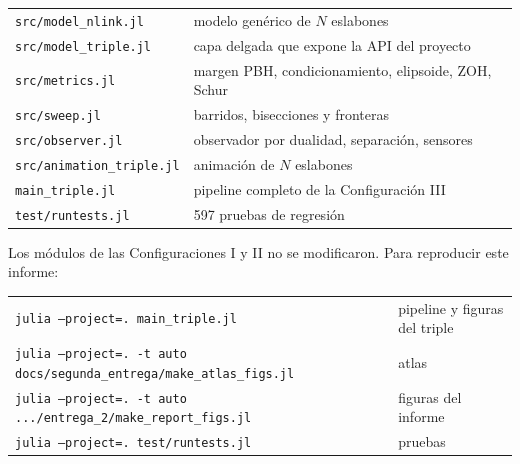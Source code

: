 \documentclass[11pt,letterpaper]{article}
\theoremstyle{definition}
\theoremstyle{plain}
\theoremstyle{remark}
\begin{document}
\begin{center}\small
\begin{tabular}{@{}ll@{}}
\toprule
\texttt{src/model\_nlink.jl} & modelo genérico de $N$ eslabones\\
\texttt{src/model\_triple.jl} & capa delgada que expone la API del proyecto\\
\texttt{src/metrics.jl} & margen PBH, condicionamiento, elipsoide, ZOH, Schur\\
\texttt{src/sweep.jl} & barridos, bisecciones y fronteras\\
\texttt{src/observer.jl} & observador por dualidad, separación, sensores\\
\texttt{src/animation\_triple.jl} & animación de $N$ eslabones\\
\texttt{main\_triple.jl} & pipeline completo de la Configuración III\\
\texttt{test/runtests.jl} & 597 pruebas de regresión\\
\bottomrule
\end{tabular}
\end{center}

Los módulos de las Configuraciones I y II no se modificaron. Para reproducir
este informe:

\begin{center}\small
\begin{tabular}{@{}ll@{}}
\toprule
\texttt{julia --project=. main\_triple.jl} & pipeline y figuras del triple\\
\texttt{julia --project=. -t auto docs/segunda\_entrega/make\_atlas\_figs.jl} & atlas\\
\texttt{julia --project=. -t auto .../entrega\_2/make\_report\_figs.jl} & figuras del informe\\
\texttt{julia --project=. test/runtests.jl} & pruebas\\
\bottomrule
\end{tabular}
\end{center}
\end{document}
